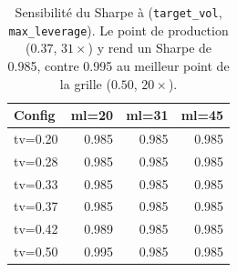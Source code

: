 \begin{table}[H]
\centering
\caption{Sensibilité du Sharpe à (\texttt{target\_vol}, \texttt{max\_leverage}). Le point de production ($0.37$, $31\times$) y rend un Sharpe de 0.985, contre 0.995 au meilleur point de la grille ($0.50$, $20\times$).}
\label{tab:sensitivity}
\begin{tabular}{lrrr}
\toprule
Config & ml=20 & ml=31 & ml=45 \\
\midrule
tv=0.20 & 0.985 & 0.985 & 0.985 \\
tv=0.28 & 0.985 & 0.985 & 0.985 \\
tv=0.33 & 0.985 & 0.985 & 0.985 \\
tv=0.37 & 0.985 & 0.985 & 0.985 \\
tv=0.42 & 0.989 & 0.985 & 0.985 \\
tv=0.50 & 0.995 & 0.985 & 0.985 \\
\bottomrule
\end{tabular}
\end{table}
